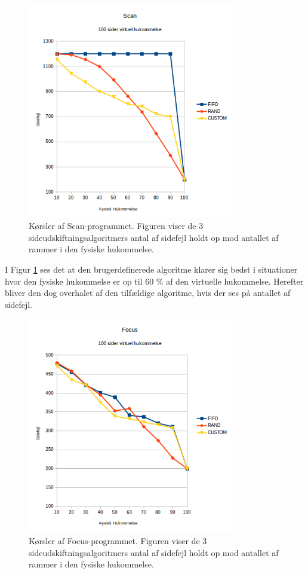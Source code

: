 \begin{figure}[H]
	\centering
	\includegraphics[width=0.8\textwidth]{figures/ScanStatistic.png}
	\caption{Kørsler af Scan-programmet. Figuren viser de 3 sideudskiftningsalgoritmers antal af sidefejl holdt op mod antallet af rammer i den fysiske hukommelse.}
	\label{fig:scanstatistic}
\end{figure}

I Figur \ref{fig:scanstatistic} ses det at den brugerdefinerede algoritme klarer sig bedst i situationer hvor den fysiske hukommelse er op til 60 \% af den virtuelle hukommelse. Herefter bliver den dog overhalet af den tilfældige algoritme, hvis der ses på antallet af sidefejl.\\

\begin{figure}[H]
	\centering
	\includegraphics[width=0.8\textwidth]{figures/FocusStatistic.png}
	\caption{Kørsler af Focus-programmet. Figuren viser de 3 sideudskiftningsalgoritmers antal af sidefejl holdt op mod antallet af rammer i den fysiske hukommelse.}
	\label{fig:focusstatistic}
\end{figure}

